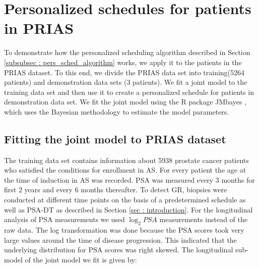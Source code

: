 
\section{Personalized schedules for patients in PRIAS}
\label{sec : pers_schedule_PRIAS}
To demonstrate how the personalized scheduling algorithm described in Section \ref{subsubsec : pers_sched_algorithm} works, we apply it to the patients in the PRIAS dataset. To this end, we divide the PRIAS data set into training(5264 patients) and demonstration data sets (3 patients). We fit a joint model to the training data set and then use it to create a personalized schedule for patients in demonstration data set. We fit the joint model using the R package JMbayes \citep{rizopoulosJMbayes}, which uses the Bayesian methodology to estimate the model parameters.

\subsection{Fitting the joint model to PRIAS dataset}
\label{subsec : jm_fit_prias}
The training data set contains information about 5938 prostate cancer patients who satisfied the conditions for enrollment in AS. For every patient the age at the time of induction in AS was recorded. PSA was measured every 3 months for first 2 years and every 6 months thereafter. To detect GR, biopsies were conducted at different time points on the basis of a predetermined schedule as well as PSA-DT as described in Section \ref{sec : introduction}. For the longitudinal analysis of PSA measurements we used $\log_2 PSA$ measurements instead of the raw data. The log transformation was done because the PSA scores took very large values around the time of disease progression. This indicated that the underlying distribution for PSA scores was right skewed. The longitudinal sub-model of the joint model we fit is given by:


